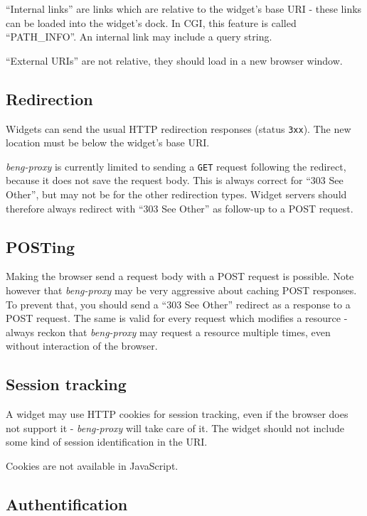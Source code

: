 \documentclass[a4paper,12pt]{article}
\begin{document}
``Internal links'' are links which are relative to the widget's base
URI - these links can be loaded into the widget's dock.  In CGI, this
feature is called ``PATH\_INFO''.  An internal link may include a
query string.

``External URIs'' are not relative, they should
load in a new browser window.

\subsection{Redirection}

Widgets can send the usual HTTP redirection responses (status
\texttt{3xx}).  The new location must be below the widget's base URI.

\emph{beng-proxy} is currently limited to sending a \texttt{GET}
request following the redirect, because it does not save the request
body.  This is always correct for ``303 See Other'', but may not be
for the other redirection types.  Widget servers should therefore
always redirect with ``303 See Other'' as follow-up to a POST request.

\subsection{POSTing}

Making the browser send a request body with a POST request is
possible.  Note however that \emph{beng-proxy} may be very aggressive
about caching POST responses.  To prevent that, you should send a
``303 See Other'' redirect as a response to a POST request.  The same
is valid for every request which modifies a resource - always reckon
that \emph{beng-proxy} may request a resource multiple times, even
without interaction of the browser.

\subsection{Session tracking}

A widget may use HTTP cookies for session tracking, even if the
browser does not support it - \emph{beng-proxy} will take care of it.
The widget should not include some kind of session identification in
the URI.

Cookies are not available in JavaScript.

\subsection{Authentification}
\end{document}
